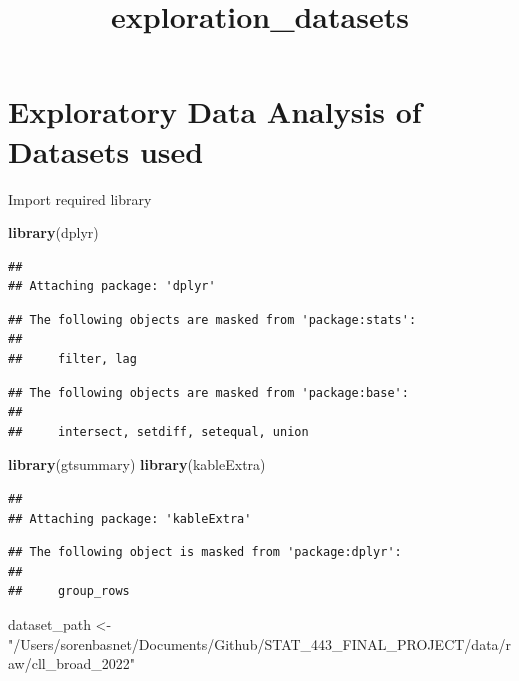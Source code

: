 \documentclass[
]{article}
\title{exploration\_datasets}
\author{}
\date{\vspace{-2.5em}}
\newenvironment{Shaded}{\begin{snugshade}}{\end{snugshade}}
\newcommand{\FunctionTok}[1]{\textcolor[rgb]{0.13,0.29,0.53}{\textbf{#1}}}
\newcommand{\NormalTok}[1]{#1}
\newcommand{\OtherTok}[1]{\textcolor[rgb]{0.56,0.35,0.01}{#1}}
\newcommand{\StringTok}[1]{\textcolor[rgb]{0.31,0.60,0.02}{#1}}
\begin{document}
\maketitle

\section{Exploratory Data Analysis of Datasets
used}\label{exploratory-data-analysis-of-datasets-used}

Import required library

\begin{Shaded}
\begin{Highlighting}[]
\FunctionTok{library}\NormalTok{(dplyr)}
\end{Highlighting}
\end{Shaded}

\begin{verbatim}
## 
## Attaching package: 'dplyr'
\end{verbatim}

\begin{verbatim}
## The following objects are masked from 'package:stats':
## 
##     filter, lag
\end{verbatim}

\begin{verbatim}
## The following objects are masked from 'package:base':
## 
##     intersect, setdiff, setequal, union
\end{verbatim}

\begin{Shaded}
\begin{Highlighting}[]
\FunctionTok{library}\NormalTok{(gtsummary)}
\FunctionTok{library}\NormalTok{(kableExtra)}
\end{Highlighting}
\end{Shaded}

\begin{verbatim}
## 
## Attaching package: 'kableExtra'
\end{verbatim}

\begin{verbatim}
## The following object is masked from 'package:dplyr':
## 
##     group_rows
\end{verbatim}

\begin{Shaded}
\begin{Highlighting}[]
\NormalTok{dataset\_path }\OtherTok{\textless{}{-}} \StringTok{"/Users/sorenbasnet/Documents/Github/STAT\_443\_FINAL\_PROJECT/data/raw/cll\_broad\_2022"}
\end{Highlighting}
\end{Shaded}
\end{document}
